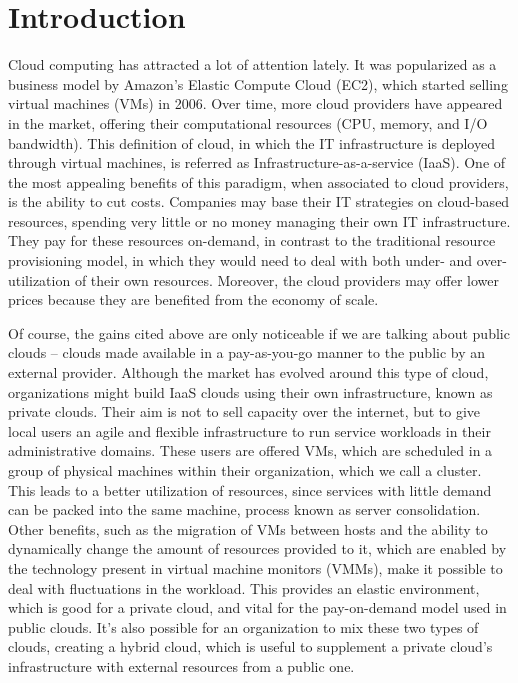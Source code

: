 \chapter{\textbf{Introduction}}

\label{Introduction}

Cloud computing has attracted a lot of attention lately. It was popularized as a business model by Amazon's Elastic Compute Cloud (EC2), which started selling virtual machines (VMs) in 2006. Over time, more cloud providers have appeared in the market, offering their computational resources (CPU, memory, and I/O bandwidth). This definition of cloud, in which the IT infrastructure is deployed through virtual machines, is referred as Infrastructure-as-a-service (IaaS). One of the most appealing benefits of this paradigm, when associated to cloud providers, is the ability to cut costs. Companies may base their IT strategies on cloud-based resources, spending very little or no money managing their own IT infrastructure. They pay for these resources on-demand, in contrast to the traditional resource provisioning model, in which they would need to deal with both under- and over- utilization of their own resources. Moreover, the cloud providers may offer lower prices because they are benefited from the economy of scale.


Of course, the gains cited above are only noticeable if we are talking about public clouds -- clouds made available in a pay-as-you-go manner to the public by an external provider. Although the market has evolved around this type of cloud, organizations might build IaaS clouds using their own infrastructure, known as private clouds. Their aim is not to sell capacity  over the internet,  but to give local users an agile and flexible infrastructure to run service workloads in their administrative domains. These users are offered VMs, which are scheduled in a group of physical machines within their organization, which we call a cluster. This leads to a better utilization of resources, since services with little demand can be packed into the same machine, process known as server consolidation. Other benefits, such as the migration of VMs between hosts and the ability to dynamically change the amount of resources provided to it, which are enabled by the  technology present in virtual machine monitors (VMMs), make it possible to deal with fluctuations in the workload. This provides an elastic environment, which is good for a private cloud, and vital for the pay-on-demand model used in public clouds.  It's also possible for an organization to mix these two types of clouds, creating a hybrid cloud,  which is useful to supplement a private cloud's infrastructure with external resources from a public one. 

